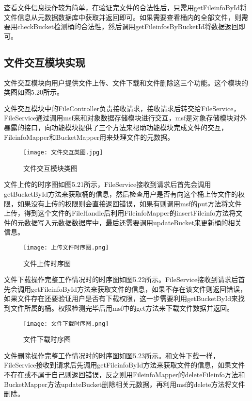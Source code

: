 查看文件信息操作较为简单，在验证完文件的合法性后，只需用getFileinfoById将文件信息从元数据数据库中获取并返回即可。如果需要查看桶内的全部文件，则需要用checkBucket检测桶的合法性，然后调用getFileinfosByBucketId将数据返回即可。

\subsection{文件交互模块实现}
文件交互模块向用户提供文件上传、文件下载和文件删除这三个功能。这个模块的类图如图5.20所示。

文件交互模块中的FileController负责接收请求，接收请求后转交给FileService，FileService通过调用msf来和对象数据存储模块进行交互，msf是对象存储模块对外暴露的接口，向功能模块提供了三个方法来帮助功能模块完成文件的交互，FileinfoMapper和BucketMapper用来处理文件的元数据。\newline

\begin{figure}
  \centering
  \texttt{[image: 文件交互类图.jpg]}
  \caption{文件交互模块类图}
\end{figure}

文件上传的时序图如图5.21所示，FileService接收到请求后首先会调用getBucketById方法来获取桶的信息，然后检查用户是否有向这个桶上传文件的权限，如果没有上传的权限则会直接返回错误，如果有则调用msf的put方法将文件上传，得到这个文件的FileHandle后利用FileinfoMapper的insertFileinfo方法将文件的元数据写入元数据数据库中，最后还需要调用updateBucket来更新桶的相关信息。

\begin{figure}
  \centering
  \texttt{[image: 上传文件时序图.png]}
  \caption{文件上传时序图}
\end{figure}

文件下载操作完整工作情况时的时序图如图5.22所示。FileService接收到请求后首先会调用getFileinfoById方法来获取文件的信息，如果不存在该文件则返回错误，如果文件存在还要验证用户是否有下载权限，这一步需要利用getBucketById来找到文件所属的桶。权限检测完毕后用msf中的get方法来下载文件数据并返回。

\begin{figure}
  \centering
  \texttt{[image: 文件下载时序图.png]}
  \caption{文件下载时序图}
\end{figure}

文件删除操作完整工作情况时的时序图如图5.23所示。和文件下载一样，FileService接收到请求后先调用getFileinfoById方法来获取文件的信息，如果文件不存在或不属于自己则返回错误，反之则用FileinfoMapper的deleteFileinfo方法和BucketMapper方法updateBucket删除相关元数据，再利用msf的delete方法将文件删除。


